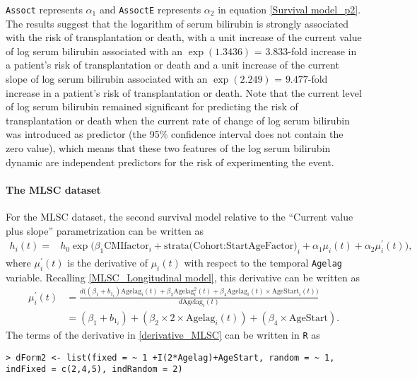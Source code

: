 \documentclass[12pt]{article}
\begin{document}
\texttt{Assoct} represents $\alpha_1$ and \texttt{AssoctE} represents $\alpha_2$ in equation \eqref{Survival model_p2}.
The results suggest that the logarithm of serum bilirubin is strongly associated with the risk of transplantation or death, with a unit increase of the current value of log serum bilirubin associated with an $\exp(1.3436)$ = $3.833$-fold increase in a patient's risk of transplantation or death and a unit increase of the current slope of log serum bilirubin associated with an $\exp(2.249)$ = $9.477$-fold increase in a patient's risk of transplantation or death. Note that the current level of log serum bilirubin remained significant for predicting the risk of transplantation or death when the current rate of change of log serum bilirubin was introduced as predictor (the 95\% confidence interval does not contain the zero value), which means that these two features of the log serum bilirubin dynamic are independent predictors for the risk of experimenting the event.

\paragraph{The MLSC dataset}

For the MLSC dataset, the second survival model relative to the ``Current value plus slope'' parametrization can be written as 
\begin{equation}
\begin{split}
h_i(t) = &h_0 \exp \big(\beta_1 \text{CMIfactor}_i + \text{strata(Cohort:StartAgeFactor)}_i  + \alpha_1 \mu_i(t)+\alpha_2 \mu_i^{'}(t)\big),
\end{split}
\label{Survival model_mlsc2}
\end{equation}
where $\mu_i^{'}(t)$ is the derivative of $\mu_i(t)$ with respect to the temporal \texttt{Agelag} variable. Recalling \eqref{MLSC_Longitudinal model}, this derivative can be written as
\begin{equation}
\begin{aligned}
\mu_i^{'}(t)&=\frac{d\big((\beta_1+b_{1_{i}} )\text{Agelag}_i(t)+\beta_2 \text{Agelag}_i^2(t)
+\beta_4 \text{Agelag}_i(t) \times \text{AgeStart}_i(t)\big)}{d\text{Agelag}_i(t)}\\
&=(\beta_1+b_{1_{i}})+(\beta_2 \times 2 \times \text{Agelag}_i(t))+(\beta_4 \times \text{AgeStart} ).
\end{aligned}
\label{derivative_MLSC}
\end{equation}
The terms of the derivative in \eqref{derivative_MLSC} can be written in \texttt{R} as
\begin{verbatim}
> dForm2 <- list(fixed = ~ 1 +I(2*Agelag)+AgeStart, random = ~ 1, 
indFixed = c(2,4,5), indRandom = 2)
\end{verbatim}
\end{document}
